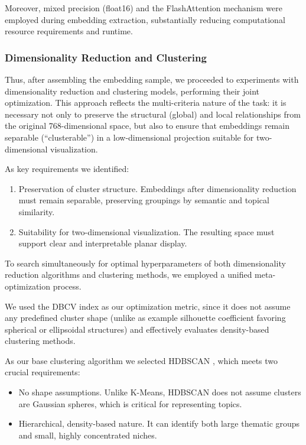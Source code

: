 Moreover, mixed precision (float16) and the FlashAttention mechanism \parencite{flash2022attention} were
employed during embedding extraction, substantially reducing computational resource requirements and runtime.

\subsubsection{Dimensionality Reduction and Clustering}
\label{sec:drc}
Thus, after assembling the embedding sample, we proceeded to experiments with dimensionality reduction and clustering
models, performing their joint optimization. This approach reflects the multi-criteria nature of the task: it is necessary
not only to preserve the structural (global) and local relationships from the original 768-dimensional space, but also
to ensure that embeddings remain separable (“clusterable”) in a low-dimensional projection suitable for two-dimensional
visualization.

As key requirements we identified:

\begin{enumerate}
    \item Preservation of cluster structure. Embeddings after dimensionality reduction must remain separable,
    preserving groupings by semantic and topical similarity.
    \item Suitability for two-dimensional visualization. The resulting space must support clear and interpretable
    planar display.
\end{enumerate}

To search simultaneously for optimal hyperparameters of both dimensionality reduction algorithms and clustering methods,
we employed a unified meta-optimization process.

We used the DBCV index as our optimization metric, since it does not assume any predefined cluster shape (unlike as example
silhouette coefficient favoring spherical or ellipsoidal structures) and effectively evaluates density-based clustering
methods.

As our base clustering algorithm we selected HDBSCAN \parencite{HDBSCAN2013}, which meets two crucial requirements:

\begin{itemize}
    \item No shape assumptions. Unlike K-Means, HDBSCAN does not assume clusters are Gaussian spheres, which is critical
    for representing topics.
    \item Hierarchical, density-based nature. It can identify both large thematic groups and small, highly concentrated niches.
\end{itemize}

